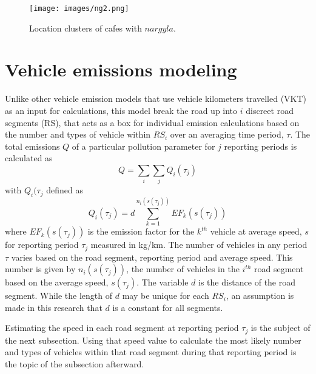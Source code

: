 %
\begin{figure}
\texttt{[image: images/ng2.png]} 
\caption{Location clusters of cafes with $nargyla$.}
\label{figng2:cafes}
\end{figure}
%
\clearpage
\section{Vehicle emissions modeling}

Unlike other vehicle emission models that use vehicle kilometers travelled (VKT) as an input for calculations, this model break the road up into $i$ discreet road segments (RS), that acts as a box for individual emission calculations based on the number and types of vehicle within $RS_{i}$ over an averaging time period, $\tau$.  The total emissions $Q$ of a particular pollution parameter for $j$ reporting periods is calculated as
%
\begin{equation}
\label{eq:totQ}
Q = \sum_{i} \sum_{j}Q_{i}(\tau_{j}) 
\end{equation}
%
\noindent
with $Q_{i}(\tau_{j}$ defined as
%
\begin{equation}
\label{eq:roadsegQ}
Q_{i}(\tau_{j}) = d\sum_{k=1}^{n_{i}(s(\tau_{j}))} EF_{k}(s(\tau_{j}))
\end{equation}
%
\noindent
where $EF_{k}(s(\tau_j))$ is the emission factor for the $k^{th}$ vehicle at average speed, $s$ for reporting period $\tau_{j}$ measured in kg/km.  The number of vehicles in any period $\tau$ varies based on the road segment, reporting period and average speed. This number is given by $n_{i}(s(\tau_{j}))$, the number of vehicles in the $i^{th}$ road segment based on the average speed, $s(\tau_{j})$. The variable $d$ is the distance of the road segment. While the length of $d$ may be unique for each $RS_{i}$, an assumption is made in this research that $d$ is a constant for all segments.

Estimating the speed in each road segment at reporting period $\tau_{j}$ is the subject of the next subsection. Using that speed value to calculate the most likely number and types of vehicles within that road segment during that reporting period is the topic of the subsection afterward.

